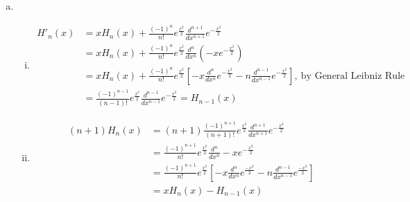 \documentclass[a4paper,12pt]{article}
\theoremstyle{definition}
\begin{document}
\begin{enumerate}
\begin{enumerate}[(a)]
\item
\begin{enumerate}[(i)]
\item 
\begin{align*}
H'_n(x) &= xH_n(x)+\frac{(-1)^n}{n!}e^{\frac{x^2}{2}}\frac{d^{n+1}}{dx^{n+1}}e^{-\frac{x^2}{2}}\\
&= xH_n(x)+\frac{(-1)^n}{n!}e^{\frac{x^2}{2}}\frac{d^{n}}{dx^{n}}(-xe^{-\frac{x^2}{2}})\\
&= xH_n(x)+\frac{(-1)^n}{n!}e^{\frac{x^2}{2}}\left[-x\frac{d^n}{dx^n}e^{-\frac{x^2}{2}}-n\frac{d^{n-1}}{dx^{n-1}}e^{-\frac{x^2}{2}}\right],~\text{by General Leibniz Rule}\\
&=\frac{(-1)^{n-1}}{(n-1)!}e^{\frac{x^2}{2}}\frac{d^{n-1}}{dx^{n-1}}e^{-\frac{x^2}{2}}=H_{n-1}(x)
\end{align*}


\item 
\begin{align*}
(n+1)H_n(x) & = (n+1)\frac{(-1)^{n+1}}{(n+1)!}e^{\frac{x^2}{2}}\frac{d^{n+1}}{dx^{n+1}}e^{-\frac{x^2}{2}}\\
& = \frac{(-1)^{n+1}}{n!}e^{\frac{x^2}{2}}\frac{d^{n}}{dx^{n}}-xe^{-\frac{x^2}{2}}\\
& = \frac{(-1)^{n+1}}{n!}e^{\frac{x^2}{2}}\left[-x\frac{d^n}{dx^n}e^{\frac{-x^2}{2}}-n\frac{d^{n-1}}{dx^{n-1}}e^{\frac{-x^2}{2}}\right]\\
&=xH_n(x) - H_{n-1}(x)
\end{align*}



\end{enumerate}
\end{enumerate}
\end{enumerate}
\end{document}
